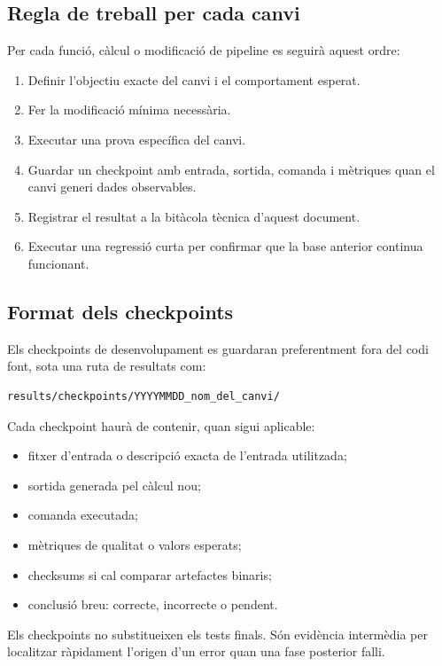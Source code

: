 \documentclass[11pt,a4paper]{article}
\begin{document}
\subsection{Regla de treball per cada canvi}

Per cada funció, càlcul o modificació de pipeline es seguirà aquest ordre:
\begin{enumerate}
  \item Definir l'objectiu exacte del canvi i el comportament esperat.
  \item Fer la modificació mínima necessària.
  \item Executar una prova específica del canvi.
  \item Guardar un checkpoint amb entrada, sortida, comanda i mètriques quan el canvi generi dades observables.
  \item Registrar el resultat a la bitàcola tècnica d'aquest document.
  \item Executar una regressió curta per confirmar que la base anterior continua funcionant.
\end{enumerate}

\subsection{Format dels checkpoints}

Els checkpoints de desenvolupament es guardaran preferentment fora del codi font, sota una ruta de resultats com:

\begin{lstlisting}[language=bash]
results/checkpoints/YYYYMMDD_nom_del_canvi/
\end{lstlisting}

Cada checkpoint haurà de contenir, quan sigui aplicable:
\begin{itemize}
  \item fitxer d'entrada o descripció exacta de l'entrada utilitzada;
  \item sortida generada pel càlcul nou;
  \item comanda executada;
  \item mètriques de qualitat o valors esperats;
  \item checksums si cal comparar artefactes binaris;
  \item conclusió breu: correcte, incorrecte o pendent.
\end{itemize}

Els checkpoints no substitueixen els tests finals. Són evidència intermèdia per localitzar ràpidament l'origen d'un error quan una fase posterior falli.
\end{document}
